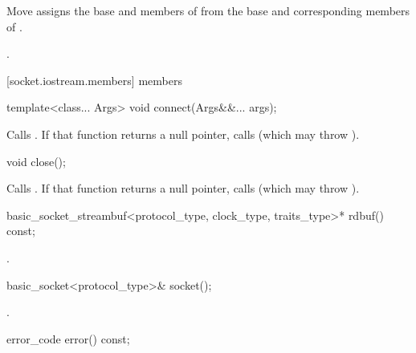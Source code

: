 \begin{itemdescr}
\pnum
\effects Move assigns the base and members of  from the base and corresponding members of .

\pnum
\returns {}.
\end{itemdescr}



[socket.iostream.members]{ members}

\begin{itemdecl}
template<class... Args>
  void connect(Args&&... args);
\end{itemdecl}

\begin{itemdescr}
\pnum
\effects Calls . If that function returns a null pointer, calls  (which may throw ).
\end{itemdescr}

\begin{itemdecl}
void close();
\end{itemdecl}

\begin{itemdescr}
\pnum
\effects Calls . If that function returns a null pointer, calls  (which may throw ).
\end{itemdescr}

\begin{itemdecl}
basic_socket_streambuf<protocol_type, clock_type, traits_type>* rdbuf() const;
\end{itemdecl}

\begin{itemdescr}
\pnum
\returns {}.
\end{itemdescr}

\begin{itemdecl}
basic_socket<protocol_type>& socket();
\end{itemdecl}

\begin{itemdescr}
\pnum
\returns {}.
\end{itemdescr}

\begin{itemdecl}
error_code error() const;
\end{itemdecl}

